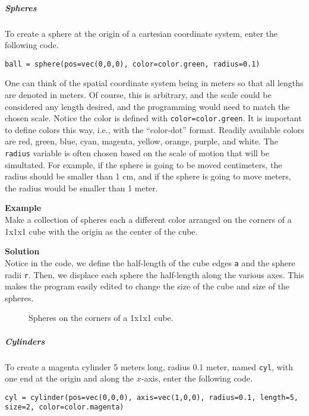 \subparagraph{Spheres}

To create a sphere at the origin of a cartesian coordinate system, enter the following code.

\begin{verbatim}
ball = sphere(pos=vec(0,0,0), color=color.green, radius=0.1)
\end{verbatim}

One can think of the spatial coordinate system being in meters so that all lengths are denoted in meters. Of course, this is arbitrary, and the scale could be considered any length desired, and the programming would need to match the chosen scale. Notice the color is defined with \texttt{color=color.green}. It is important to define colors this way, i.e., with the ``color-dot'' format. Readily available colors are red, green, blue, cyan, magenta, yellow, orange, purple, and white. The \texttt{radius} variable is often chosen based on the scale of motion that will be simultated. For example, if the sphere is going to be moved centimeters, the radius should be smaller than 1 cm, and if the sphere is going to move meters, the radius would be smaller than 1 meter.

\begin{framed}
\textbf{Example}\\
Make a collection of spheres each a different color arranged on the corners of a 1x1x1 cube with the origin as the center of the cube.

\begin{framed}
\textbf{Solution}\\
Notice in the code, we define the half-length of the cube edges \texttt{a} and the sphere radii \texttt{r}. Then, we displace each sphere the half-length along the various axes. This makes the program easily edited to change the size of the cube and size of the spheres.

\begin{figure}[!htbp]
\centering
\caption[]{Spheres on the corners of a 1x1x1 cube.}
\label{ex:visualpython:simplecube}
\end{figure}
\end{framed}
\end{framed}

\subparagraph{Cylinders}

To create a magenta cylinder 5 meters long, radius 0.1 meter, named \texttt{cyl}, with one end at the origin and along the $x$-axis, enter the following code.

\begin{verbatim}
cyl = cylinder(pos=vec(0,0,0), axis=vec(1,0,0), radius=0.1, length=5, size=2, color=color.magenta)
\end{verbatim}


